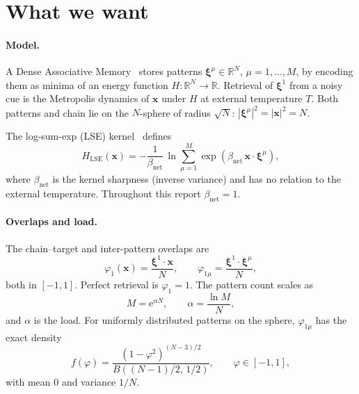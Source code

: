 \documentclass[11pt]{article}
\newcommand{\bxi}{\boldsymbol{\xi}}
\newcommand{\bx}{\bm{x}}
\newcommand{\e}{{\mathrm{e}}}
\newcommand{\Bnet}{\beta_{\mathrm{net}}}
\begin{document}
\section{What we want}
\label{sec:want}

\paragraph{Model.}
A Dense Associative Memory~\citep{krotov2016dense} stores patterns
$\bxi^\mu \in \mathbb{R}^N$, $\mu = 1, \dots, M$, by encoding them as
minima of an energy function $H : \mathbb{R}^N \to \mathbb{R}$.
Retrieval of $\bxi^1$ from a noisy cue is the Metropolis dynamics of
$\bx$ under $H$ at external temperature $T$.  Both patterns and
chain lie on the $N$-sphere of radius $\sqrt N$:
$|\bxi^\mu|^2 = |\bx|^2 = N$.

The log-sum-exp (LSE) kernel~\citep{ramsauer2021hopfield} defines
\begin{equation}
H_{\mathrm{LSE}}(\bx) = -\frac{1}{\Bnet}\,
   \ln\!\sum_{\mu=1}^{M} \exp(\Bnet\,\bx \cdot \bxi^\mu),
\label{eq:lse}
\end{equation}
where $\Bnet$ is the kernel sharpness (inverse variance) and has no
relation to the external temperature.  Throughout this report
$\Bnet = 1$.

\paragraph{Overlaps and load.}
The chain--target and inter-pattern overlaps are
\begin{equation}
\varphi_1(\bx) = \frac{\bxi^1 \cdot \bx}{N},
\qquad
\varphi_{1\mu} = \frac{\bxi^1 \cdot \bxi^\mu}{N},
\label{eq:overlaps}
\end{equation}
both in $[-1, 1]$.  Perfect retrieval is $\varphi_1 = 1$.  The pattern
count scales as
\begin{equation}
M = \e^{\alpha N},
\qquad \alpha = \frac{\ln M}{N},
\label{eq:alpha}
\end{equation}
and $\alpha$ is the load.  For uniformly distributed patterns on
the sphere, $\varphi_{1\mu}$ has the exact density
\begin{equation}
f(\varphi) = \frac{(1 - \varphi^2)^{(N-3)/2}}
                  {B((N-1)/2,\,1/2)},
\qquad \varphi \in [-1, 1],
\label{eq:exact-density}
\end{equation}
with mean $0$ and variance $1/N$.
\end{document}
